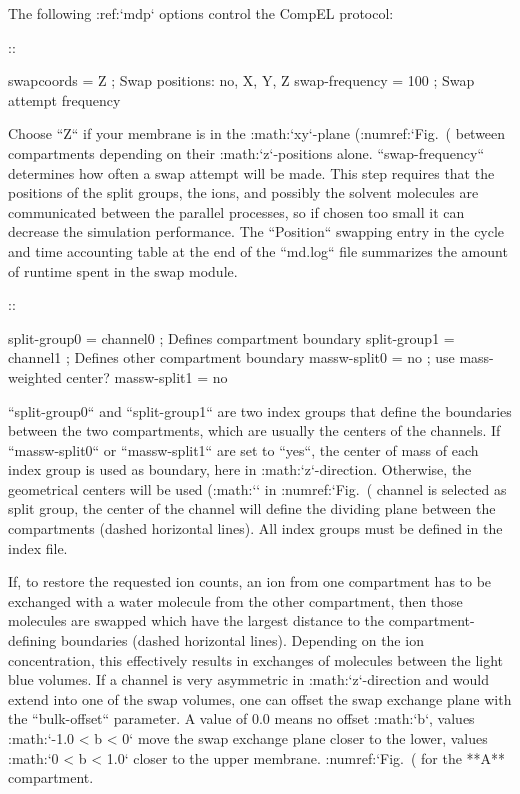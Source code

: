 The following :ref:`mdp` options control the CompEL protocol:

::

    swapcoords     = Z        ; Swap positions: no, X, Y, Z
    swap-frequency = 100      ; Swap attempt frequency

Choose ``Z`` if your membrane is in the :math:`xy`-plane
(:numref:`Fig. (%
between compartments depending on their :math:`z`-positions alone.
``swap-frequency`` determines how often a swap attempt will
be made. This step requires that the positions of the split groups, the
ions, and possibly the solvent molecules are communicated between the
parallel processes, so if chosen too small it can decrease the
simulation performance. The ``Position`` swapping entry in
the cycle and time accounting table at the end of the
``md.log`` file summarizes the amount of runtime spent in
the swap module.

::

    split-group0   = channel0 ; Defines compartment boundary
    split-group1   = channel1 ; Defines other compartment boundary
    massw-split0   = no       ; use mass-weighted center?
    massw-split1   = no

``split-group0`` and ``split-group1`` are two
index groups that define the boundaries between the two compartments,
which are usually the centers of the channels. If
``massw-split0`` or ``massw-split1`` are set to
``yes``, the center of mass of each index group is used as
boundary, here in :math:`z`-direction. Otherwise, the geometrical
centers will be used (:math:`\times` in
:numref:`Fig. (%
channel is selected as split group, the center of the channel will
define the dividing plane between the compartments (dashed horizontal
lines). All index groups must be defined in the index file.

If, to restore the requested ion counts, an ion from one compartment has
to be exchanged with a water molecule from the other compartment, then
those molecules are swapped which have the largest distance to the
compartment-defining boundaries (dashed horizontal lines). Depending on
the ion concentration, this effectively results in exchanges of
molecules between the light blue volumes. If a channel is very
asymmetric in :math:`z`-direction and would extend into one of the swap
volumes, one can offset the swap exchange plane with the
``bulk-offset`` parameter. A value of 0.0 means no offset
:math:`b`, values :math:`-1.0 < b < 0` move the swap exchange plane
closer to the lower, values :math:`0 < b < 1.0` closer to the upper
membrane. :numref:`Fig. (%
for the **A** compartment.

